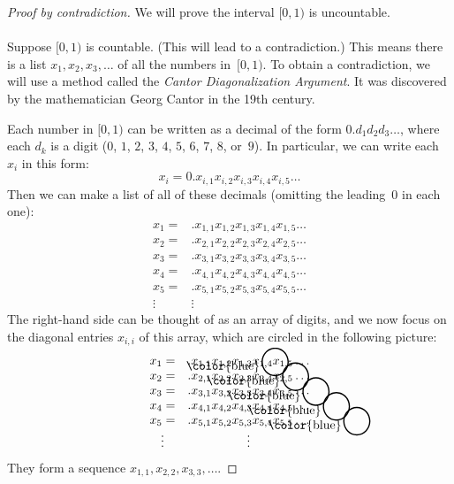 \documentclass[../MATH-2000-Notes.tex]{subfiles}
\begin{document}
\begin{proof}[Proof by contradiction]
    We will prove the interval \([0,1)\) is uncountable.
    \\~\\
    Suppose $[0,1)$ is countable. (This will lead to a contradiction.) This means there is a list $x_1,x_2,x_3,\ldots$ of all the numbers in~$[0,1)$. 
    To obtain a contradiction, we will use a method called the \emph{Cantor Diagonalization Argument}. It was discovered by the mathematician Georg Cantor in the 19th century.
    
    Each number in $[0,1)$ can be written as a decimal of the form $0.d_1d_2d_3\ldots$, where each $d_k$ is a digit ($0$, $1$, $2$, $3$, $4$, $5$, $6$, $7$, $8$, or~$9$). In particular, we can write each $x_i$ in this form:
        $$ x_i = 0. x_{i,1} x_{i,2} x_{i,3} x_{i,4} x_{i,5} \ldots $$
     Then we can make a list of all of these decimals (omitting the leading~$0$ in each one):
        $$\begin{matrix}
        x_1= & . x_{1,1} x_{1,2} x_{1,3} x_{1,4} x_{1,5} \ldots \\
        x_2= & . x_{2,1} x_{2,2} x_{2,3} x_{2,4} x_{2,5} \ldots \\
        x_3= & . x_{3,1} x_{3,2} x_{3,3} x_{3,4} x_{3,5} \ldots \\
        x_4= & . x_{4,1} x_{4,2} x_{4,3} x_{4,4} x_{4,5} \ldots \\
        x_5= & . x_{5,1} x_{5,2} x_{5,3} x_{5,4} x_{5,5} \ldots \\
        \vdots & \vdots 
        \end{matrix} $$
    The right-hand side can be thought of as an array of digits, and we now focus on the diagonal entries $x_{i,i}$ of this array, which are circled in the following picture:
    \def\circleit{\vbox to 0pt{\vss\hbox to 0pt{\hskip-4pt\color{blue}\Huge$\bigcirc$\hss}\vskip-9pt}}
        $$\begin{matrix}
        x_1= & . \circleit x_{1,1} x_{1,2} x_{1,3} x_{1,4} x_{1,5} \ldots \\
        x_2= & . x_{2,1} \circleit x_{2,2} x_{2,3} x_{2,4} x_{2,5} \ldots \\
        x_3= & . x_{3,1} x_{3,2} \circleit x_{3,3} x_{3,4} x_{3,5} \ldots \\
        x_4= & . x_{4,1} x_{4,2} x_{4,3} \circleit x_{4,4} x_{4,5} \ldots \\
        x_5= & . x_{5,1} x_{5,2} x_{5,3} x_{5,4} \circleit x_{5,5} \ldots \\
        \vdots & \vdots 
        \end{matrix} $$
    They form a sequence $x_{1,1}, x_{2,2}, x_{3,3}, \ldots$. 
    

\end{proof}
\end{document}
